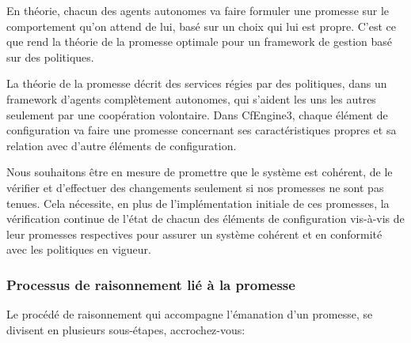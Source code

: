 En théorie, chacun des agents autonomes va faire formuler une promesse sur le
comportement qu'on attend de lui, basé sur un choix qui lui est propre. C'est ce
que rend la théorie de la promesse optimale pour un framework de gestion basé
sur des politiques.

La théorie de la promesse décrit des services régies par des politiques, dans un
framework d'agents complètement autonomes, qui s'aident les uns les autres
seulement par une coopération volontaire. Dans CfEngine3, chaque élément de
configuration va faire une promesse concernant ses caractéristiques propres et
sa relation avec d'autre éléments de configuration.

Nous souhaitons être en mesure de promettre que le système est cohérent, de le
vérifier et d'effectuer des changements seulement si nos promesses ne sont pas
tenues. Cela nécessite, en plus de l'implémentation initiale de ces promesses,
la vérification continue de l'état de chacun des éléments de configuration
vis-à-vis de leur promesses respectives pour assurer un système cohérent et en
conformité avec les politiques en vigueur.


\subsubsection{Processus de raisonnement lié à la promesse}

Le procédé de raisonnement qui accompagne l'émanation d'un promesse, se divisent
en plusieurs sous-étapes, accrochez-vous:

